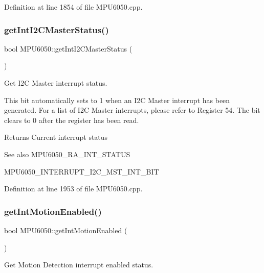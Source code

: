Definition at line 1854 of file M\+P\+U6050.\+cpp.

\mbox{\label{classMPU6050_a31d6c2b03fc2d6ce82d67d142f316851}} 
\subsubsection{\texorpdfstring{getIntI2CMasterStatus()}{getIntI2CMasterStatus()}}
{\footnotesize\ttfamily bool M\+P\+U6050\+::get\+Int\+I2\+C\+Master\+Status (\begin{DoxyParamCaption}{ }\end{DoxyParamCaption})}



Get I2C Master interrupt status. 

This bit automatically sets to 1 when an I2C Master interrupt has been generated. For a list of I2C Master interrupts, please refer to Register 54. The bit clears to 0 after the register has been read. \begin{DoxyReturn}{Returns}
Current interrupt status 
\end{DoxyReturn}
\begin{DoxySeeAlso}{See also}
M\+P\+U6050\+\_\+\+R\+A\+\_\+\+I\+N\+T\+\_\+\+S\+T\+A\+T\+US 

M\+P\+U6050\+\_\+\+I\+N\+T\+E\+R\+R\+U\+P\+T\+\_\+\+I2\+C\+\_\+\+M\+S\+T\+\_\+\+I\+N\+T\+\_\+\+B\+IT 
\end{DoxySeeAlso}


Definition at line 1953 of file M\+P\+U6050.\+cpp.

\mbox{\label{classMPU6050_a7de31a8e9f22765329d9f9e02db2f1f0}} 
\subsubsection{\texorpdfstring{getIntMotionEnabled()}{getIntMotionEnabled()}}
{\footnotesize\ttfamily bool M\+P\+U6050\+::get\+Int\+Motion\+Enabled (\begin{DoxyParamCaption}{ }\end{DoxyParamCaption})}



Get Motion Detection interrupt enabled status. 

